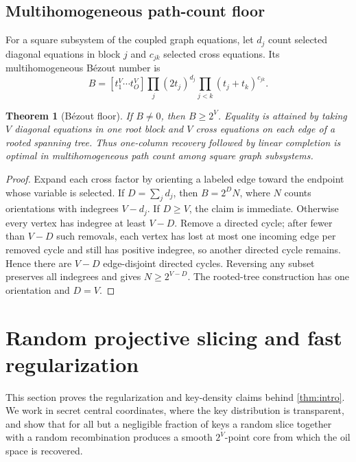 \documentclass[10pt,a4paper]{article}
\newtheorem{theorem}{Theorem}[section]
\begin{document}
\subsection{Multihomogeneous path-count floor}

For a square subsystem of the coupled graph equations, let $d_j$ count selected diagonal equations in block $j$ and $c_{jk}$ selected cross equations. Its multihomogeneous B\'ezout number is
\[
B=[t_1^V\cdots t_O^V]\prod_j(2t_j)^{d_j}\prod_{j<k}(t_j+t_k)^{c_{jk}}.
\]

\begin{theorem}[B\'ezout floor]\label{thm:bezout}
If $B\ne0$, then $B\ge2^V$. Equality is attained by taking $V$ diagonal equations in one root block and $V$ cross equations on each edge of a rooted spanning tree. Thus one-column recovery followed by linear completion is optimal in multihomogeneous path count among square graph subsystems.
\end{theorem}

\begin{proof}
Expand each cross factor by orienting a labeled edge toward the endpoint whose variable is selected. If $D=\sum_jd_j$, then $B=2^DN$, where $N$ counts orientations with indegrees $V-d_j$. If $D\ge V$, the claim is immediate. Otherwise every vertex has indegree at least $V-D$.  Remove a directed cycle; after fewer than $V-D$ such removals, each vertex has lost at most one incoming edge per removed cycle and still has positive indegree, so another directed cycle remains.  Hence there are $V-D$ edge-disjoint directed cycles.  Reversing any subset preserves all indegrees and gives $N\ge2^{V-D}$. The rooted-tree construction has one orientation and $D=V$.
\end{proof}

\section{Random projective slicing and fast regularization}\label{sec:projective}

This section proves the regularization and key-density claims behind \cref{thm:intro}. We work in secret central coordinates, where the key distribution is transparent, and show that for all but a negligible fraction of keys a random slice together with a random recombination produces a smooth $2^V$-point core from which the oil space is recovered.
\end{document}
